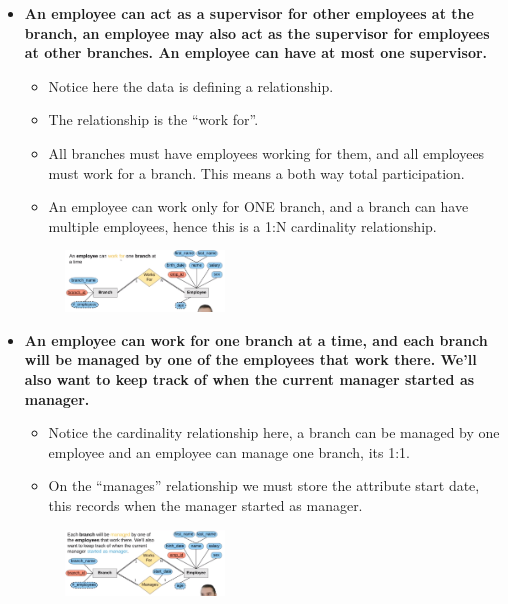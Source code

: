 \begin{itemize}
    \item \textbf{An employee can act as a supervisor for other employees at the branch, an employee may also act as the supervisor for employees at other branches. An employee can have at most one supervisor.}
        \begin{itemize}
            \item Notice here the data is defining a relationship.
            \item The relationship is the ``work for''.
            \item All branches must have employees working for them, and all employees must work for a branch. This means a both way total participation.
            \item An employee can work only for ONE branch, and a branch can have multiple employees, hence this is a 1:N cardinality relationship.
        \end{itemize}
        \begin{figure}[H]
            \centering
            \includegraphics[width=0.4\textwidth]{./Figs/2020-12-24-00-16-07.png}
        \end{figure}
    
    \item \textbf{An employee can work for one branch at a time, and each branch will be managed by one of the employees that work there. We'll also want to keep track of when the current manager started as manager.}
        \begin{itemize}
            \item Notice the cardinality relationship here, a branch can be managed by one employee and an employee can manage one branch, its 1:1. 
            \item On the ``manages'' relationship we must store the attribute start date, this records when the manager started as manager.
        \end{itemize}
        \begin{figure}[H]
            \centering
            \includegraphics[width=0.4\textwidth]{./Figs/2020-12-24-00-20-01.png}
        \end{figure}
    

\end{itemize}
